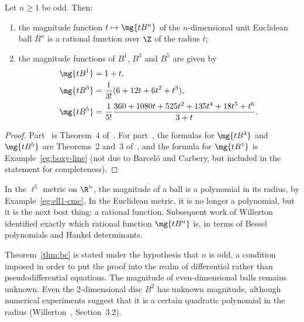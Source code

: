 \begin{thm}
%
%
%
% 
Let $n \geq 1$ be odd.  Then:
% 
\begin{enumerate}
\item
{}
the magnitude function $t \mapsto \mg{tB^n}$ of the $n$-dimensional unit
Euclidean ball $B^n$ is a rational function over $\Z$ of the radius $t$;%
% 

\item
{}
the magnitude functions of $B^1$, $B^3$ and $B^5$ are given by
% 
\begin{align*}
\mg{tB^1}       &
=
1 + t,  \\
\mg{tB^3}       &
=
\frac{1}{3!}(6 + 12t + 6t^2 + t^3),
\\
\mg{tB^5}       &
=
\frac{1}{5!}
\frac{360 + 1080t + 525t^2 + 135t^4 + 18t^5 + t^6}{3 + t}.
\end{align*}
\end{enumerate}
\end{thm}

\begin{proof}
Part~ is Theorem~4 of~\cite{BaCa}.  For
part~, the formulas for $\mg{tB^3}$ and $\mg{tB^5}$ are
Theorems~2 and~3 of~\cite{BaCa}, and the formula for $\mg{tB^1}$ is
Example~\ref{eg:boxy-line} (not due to Barcel\'o and Carbery, but included
in the statement for completeness).
\end{proof}

In the $\ell^1$ metric on $\R^n$, the magnitude of a ball is a polynomial
in its radius, by Example~\ref{eg:ell1-cmc}.  In the Euclidean metric, it
is no longer a polynomial, but it is the next best thing: a rational
function.  Subsequent work of Willerton~\cite{WillMOBH,WillMOBP}%
%
% 
identified exactly which rational function $\mg{tB^n}$ is, in terms of
Bessel%
%
%
polynomials and Hankel%
%
%
determinants.

Theorem~\ref{thm:bc} is stated under the hypothesis that $n$ is odd, a
condition imposed in order to put the proof into the realm of differential
rather than pseudodifferential equations.  The magnitude of
even-dimensional balls remains unknown.  Even the 2-dimensional disc $B^2$
has unknown magnitude, although numerical experiments suggest that it is a
certain quadratic polynomial in the radius (Willerton~\cite{WillHCC},
Section~3.2).

